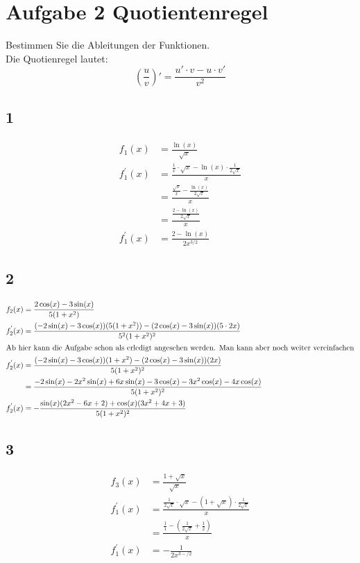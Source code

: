 \documentclass[18pt, 4paper]{article}
\begin{document}
\section*{Aufgabe 2 Quotientenregel}
Bestimmen Sie die Ableitungen der Funktionen.\\
Die Quotienregel lautet:
\begin{equation*}
	\left(\frac{u}{v}\right)' = \frac{u'\cdot v - u \cdot v'}{v^2}
\end{equation*}
\subsection*{1}
\begin{align*}
	f_1(x) &= \frac{\ln(x)}{\sqrt{x}}\\
	f_1^{'}(x) &= \frac{\frac{1}{x}\cdot \sqrt{x}- \ln(x)\cdot \frac{1}{2\sqrt{x}}}{x}\\
		 &= \frac{\frac{\sqrt{x}}{x}- \frac{\ln(x)}{2\sqrt{x}}}{x}\\
		 &= \frac{\frac{2-\ln(x)}{2\sqrt{x}}}{x}\\
	f_1^{'}(x) &= \frac{2-\ln(x)}{2x^{3/2}}
\end{align*}
\subsection*{2}
\begin{align*}
	f_2(x) &= \frac{2\cos(x)-3\sin(x)}{5(1+x^2)}\\
	f_2^{'}(x) &= \frac{(-2\sin(x)-3\cos(x))(5(1+x^2))-(2\cos(x)-3\sin(x))(5\cdot 2x)}{5^2(1+x^2)^2}\\
	\intertext{Ab hier kann die Aufgabe schon als erledigt angesehen werden. Man kann aber noch weiter vereinfachen}
	f_2^{'}(x) &= \frac{(-2\sin(x)-3\cos(x))(1+x^2)-(2\cos(x)-3\sin(x))(2x)}{5(1+x^2)^2}\\
		 &= \frac{-2\sin(x) -2x^2\sin(x)+6x\sin(x) -3\cos(x)-3x^2\cos(x)-4x\cos(x)}{5(1+x^2)^2}\\
	f_2^{'}(x) &= -\frac{\sin(x)(2x^2-6x+2)+\cos(x)(3x^2+4x+3)}{5(1+x^2)^2}
\end{align*}
\subsection*{3}
\begin{align*}
	f_3(x) &= \frac{1+\sqrt{x}}{\sqrt{x}}\\
	f_1^{'}(x) &= \frac{\frac{1}{2\sqrt{x}} \cdot \sqrt{x} -(1+\sqrt{x})\cdot \frac{1}{2\sqrt{x}}}{x}\\
		 &= \frac{\frac{1}{1}- (\frac{1}{2\sqrt{x}}+\frac{1}{2})}{x}\\
	f_1^{'}(x) &= -\frac{1}{2x^{3- /2}}
\end{align*}
\end{document}
